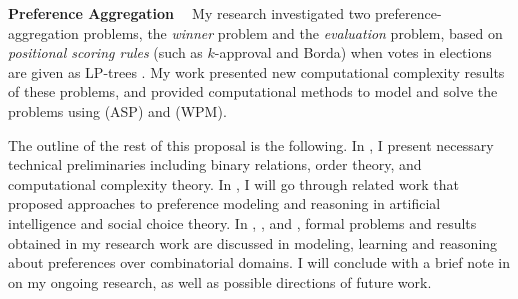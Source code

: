 \smallskip \noindent \textbf{Preference Aggregation  \ }
My research investigated two preference-aggregation 
problems, the \emph{winner} problem and the \emph{evaluation} problem,
based on \textit{positional scoring rules} (such as $k$-approval and Borda) 
when votes in elections are given as LP-trees \cite{abs/ijcai13dc/Liu,conf/adt13/LiuT}. 
My work presented new computational complexity results of these problems, and
provided computational methods to model and solve the problems using
 (ASP) and  (WPM).



The outline of the rest of this proposal is the following. 
In , I present necessary technical preliminaries
including binary relations, order theory, and computational complexity theory.
In , I will go through related work that proposed
approaches to preference modeling and reasoning
in artificial intelligence and social choice theory.
In ,  , and ,
formal problems and results obtained in my research work are discussed
in modeling, learning and reasoning about preferences over combinatorial domains.
I will conclude with a brief note in  on my ongoing research,
as well as possible directions of future work.
